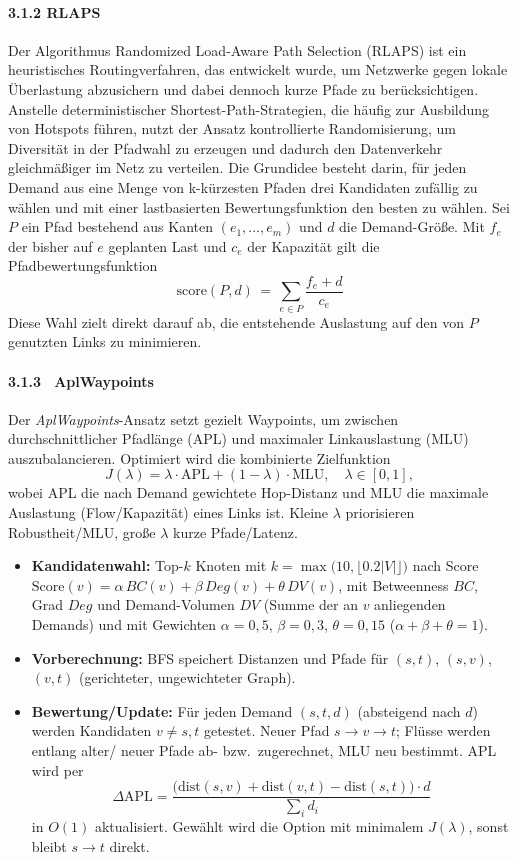 \documentclass[sigconf,nonacm,review,language=english,language=german]{acmart}
\begin{document}
         \paragraph{3.1.2   RLAPS}
            Der Algorithmus Randomized Load-Aware Path Selection (RLAPS) ist ein heuristisches Routingverfahren, das entwickelt wurde, um Netzwerke gegen lokale Überlastung abzusichern und dabei dennoch kurze Pfade zu berücksichtigen. Anstelle deterministischer Shortest-Path-Strategien, die häufig zur Ausbildung von Hotspots führen, nutzt der Ansatz kontrollierte Randomisierung, um Diversität in der Pfadwahl zu erzeugen und dadurch den Datenverkehr gleichmäßiger im Netz zu verteilen. 
            Die Grundidee besteht darin, für jeden Demand aus eine Menge von k-kürzesten Pfaden drei Kandidaten zufällig zu wählen und mit einer lastbasierten Bewertungsfunktion den besten zu wählen. Sei $P$ ein Pfad bestehend aus Kanten $(e_1,\dots,e_m)$ und $d$ die Demand-Größe. Mit $f_e$ der bisher auf $e$ geplanten Last und $c_e$ der Kapazität gilt die Pfadbewertungsfunktion
            $$
            \mathrm{score}(P,d) \,=\, \sum_{e\in P} \frac{f_e + d}{c_e}
            $$
            Diese Wahl zielt direkt darauf ab, die entstehende Auslastung auf den von $P$ genutzten Links zu minimieren. 
            
        \paragraph{3.1.3 \, AplWaypoints}
Der \textit{AplWaypoints}-Ansatz setzt gezielt Waypoints, um zwischen durchschnittlicher Pfadlänge (APL) und maximaler Linkauslastung (MLU) auszubalancieren. Optimiert wird die kombinierte Zielfunktion
\[
J(\lambda)=\lambda\cdot \text{APL} + (1-\lambda)\cdot \text{MLU}, \quad \lambda\in[0,1],
\]
wobei APL die nach Demand gewichtete Hop-Distanz und MLU die maximale Auslastung (Flow/Kapazität) eines Links ist. Kleine $\lambda$ priorisieren Robustheit/MLU, große $\lambda$ kurze Pfade/Latenz.

\begin{itemize}
  \item \textbf{Kandidatenwahl:} Top-$k$ Knoten mit
  \(
  k=\max\!\bigl(10,\lfloor 0.2|V|\rfloor\bigr)
  \)
  nach Score
  \(
  \mathrm{Score}(v)=\alpha\,BC(v)+\beta\,Deg(v)+\theta\,DV(v)
\),
mit Betweenness $BC$, Grad $Deg$ und Demand-Volumen $DV$ (Summe der an $v$ anliegenden Demands)
und mit Gewichten $\alpha=0{,}5$, $\beta=0{,}3$, $\theta=0{,}15$ \;(\(\alpha+\beta+\theta=1\)).

  \item \textbf{Vorberechnung:} BFS speichert Distanzen und Pfade für $(s,t)$, $(s,v)$, $(v,t)$ (gerichteter, ungewichteter Graph).
  \item \textbf{Bewertung/Update:} Für jeden Demand $(s,t,d)$ (absteigend nach $d$) werden Kandidaten $v\neq s,t$ getestet. Neuer Pfad $s\!\to\!v\!\to\!t$; Flüsse werden entlang alter/ neuer Pfade ab- bzw.\ zugerechnet, MLU neu bestimmt. APL wird per
  \[
  \Delta\text{APL}=\frac{\bigl(\text{dist}(s,v)+\text{dist}(v,t)-\text{dist}(s,t)\bigr)\cdot d}{\sum_i d_i}
  \]
  in $O(1)$ aktualisiert. Gewählt wird die Option mit minimalem $J(\lambda)$, sonst bleibt $s\!\to\!t$ direkt.
\end{itemize}
\end{document}
